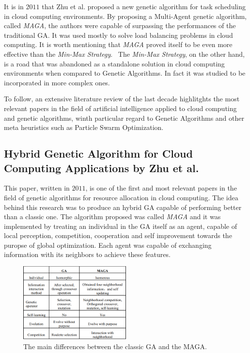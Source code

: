 It is in $2011$ that Zhu et al. proposed a new genetic algorithm for task scheduling in cloud computing environments.
By proposing a Multi-Agent genetic algorithm, called \textit{MAGA}, the authors were capable of surpassing the performances of the traditional GA.
It was used mostly to solve load balancing problems in cloud computing. It is worth mentioning that \textit{MAGA} proved itself to be even more effective than the 
\textit{Min-Max Strategy}.~\cite{zhu2011genetic} 
The \textit{Min-Max Strategy}, on the other hand, is a road that was abandoned as a standalone solution in cloud computing environments when compared to Genetic Algorithms. In fact it
was studied to be incorporated in more complex ones.~\cite{elzeki2012improved}

To follow, an extensive literature review of the last decade highlitghts the most relevant papers in the field of artificial intelligence applied to
cloud computing and genetic algorithms, winth particular regard to Genetic Algorithms and other meta heuristics such as Particle Swarm Optimization.

\subsection{Hybrid Genetic Algorithm for Cloud Computing Applications by Zhu et al.}
This paper, written in $2011$, is one of the first and most relevant papers in the field of genetic algorithms for resource allocation
in cloud computing. The idea behind this research was to produce an hybrid GA capable of performing better than a classic one.
The algorithm proposed was called \textit{MAGA} and it was implemented by treating an individual in the GA itself as an agent, capable 
of local perception, competition, cooperation and self improvement towards the puropse of global optimization.
Each agent was capable of exchanging information with its neighbors to achieve these features.

\begin{figure}[h]
    \centering
    \includegraphics[width=0.5\textwidth]{Resources/litreview/MAGA/ga_vs_maga.png}
    \caption{The main differences between the classic GA and the MAGA.}
    \label{table:maga}
\end{figure}

